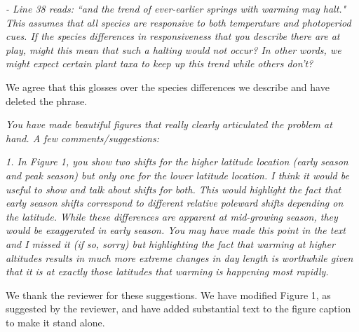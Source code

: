\documentclass{article}
\begin{document}
\par \emph{- Line 38 reads: ``and the trend of ever-earlier springs with warming may halt." This assumes that all species are responsive to both temperature and photoperiod cues. If the species differences in responsiveness that you describe there are at play, might this mean that such a halting would not occur? In other words, we might expect certain plant taxa to keep up this trend while others don't? }
\par We agree that this glosses over the species differences we describe and have deleted the phrase. 
\par \emph{You have made beautiful figures that really clearly articulated the problem at hand. A few comments/suggestions: }
\par \emph{1. In Figure 1, you show two shifts for the higher latitude location (early season and peak season) but only one for the lower latitude location. I think it would be useful to show and talk about shifts for both. This would highlight the fact that early season shifts correspond to different relative poleward shifts depending on the latitude. While these differences are apparent at mid-growing season, they would be exaggerated in early season. You may have made this point in the text and I missed it (if so, sorry) but highlighting the fact that warming at higher altitudes results in much more extreme changes in day length is worthwhile given that it is at exactly those latitudes that warming is happening most rapidly. }
\par We thank the reviewer for these suggestions. We have modified Figure 1, as suggested by the reviewer, and have added substantial text to the figure caption to make it stand alone. 
\end{document}
